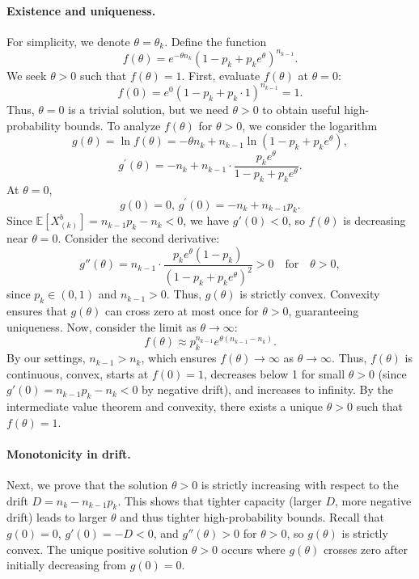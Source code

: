 \paragraph{Existence and uniqueness.} For simplicity, we denote $\theta=\theta_k$. Define the function
\[
f(\theta) = e^{-\theta n_{k}} (1 - p_k + p_k e^{\theta})^{n_{k-1}}.
\]
We seek \(\theta > 0\) such that \(f(\theta) = 1\). First, evaluate \(f(\theta)\) at \(\theta = 0\):
\[
f(0) = e^{0} (1 - p_k + p_k \cdot 1)^{n_{k-1}} = 1.
\]
Thus, \(\theta = 0\) is a trivial solution, but we need \(\theta > 0\) to obtain useful high-probability bounds. To analyze $f(\theta)$ for $\theta>0$, we consider the logarithm
$$g(\theta) = \ln f(\theta) = -\theta n_{k} + n_{k-1} \ln(1 - p_k + p_k e^{\theta}),$$
$$ g^\prime(\theta) = -n_{k} + n_{k-1} \cdot \frac{p_k e^{\theta}}{1 - p_k + p_k e^{\theta}}.$$
At \(\theta = 0\),
\[
g(0)=0,\,g^\prime(0) = -n_{k} + n_{k-1} p_k.
\]
Since \(\mathbb{E}[X^b_{(k)}] = n_{k-1} p_k - n_{k} < 0\), we have \(g'(0) < 0\), so \(f(\theta)\) is decreasing near \(\theta = 0\). Consider the second derivative:
\[
g''(\theta) = n_{k-1} \cdot \frac{p_k e^{\theta} (1 - p_k)}{(1 - p_k + p_k e^{\theta})^2} > 0 \quad \text{for} \quad \theta > 0,
\]
since \(p_k \in (0, 1)\) and \(n_{k-1} > 0\). Thus, \(g(\theta)\) is strictly convex. Convexity ensures that $g(\theta)$ can cross zero at most once for $\theta>0$, guaranteeing uniqueness. Now, consider the limit as \(\theta \to \infty\):
\[
f(\theta) \approx p_k^{n_{k-1}} e^{\theta (n_{k-1} - n_{k})}.
\]
By our settings, $n_{k-1}>n_k$, which ensures $f(\theta)\to \infty$ as $\theta\to \infty$. Thus, \(f(\theta)\) is continuous, convex, starts at \(f(0) = 1\), decreases below 1 for small \(\theta > 0\) (since $g'(0) = n_{k-1}p_k - n_k < 0$ by negative drift), and increases to infinity. By the intermediate value theorem and convexity, there exists a unique \(\theta > 0\) such that \(f(\theta) = 1\). 

\paragraph{Monotonicity in drift.} Next, we prove that the solution $\theta>0$ is strictly increasing with respect to the drift \(D = n_k - n_{k-1} p_k\). This shows that tighter capacity (larger $D$, more negative drift) leads to larger $\theta$ and thus tighter high-probability bounds. Recall that \(g(0) = 0\), \(g'(0) = -D < 0\), and \(g''(\theta) > 0\) for \(\theta > 0\), so \(g(\theta)\) is strictly convex. The unique positive solution \(\theta > 0\) occurs where \(g(\theta)\) crosses zero after initially decreasing from \(g(0) = 0\).

